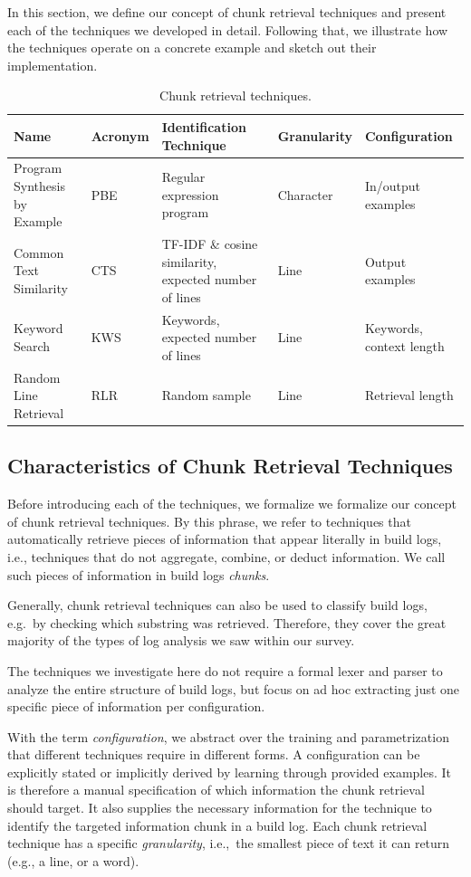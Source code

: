 In this section, we define our concept of chunk
retrieval techniques and present each of the techniques
we developed in detail.
Following that, we illustrate how the techniques
operate on a concrete
example and sketch out their implementation.

\begin{table}[htb]
\centering
\caption{Chunk retrieval techniques.}
\begin{tabularx}{\textwidth}{@{}llXll@{}}
\toprule
Name			     & Acronym & Identification Technique
& Granularity & Configuration \\
\midrule
Program Synthesis by Example & PBE     & Regular expression program
& Character   & In/output examples	\\
Common Text Similarity	     & CTS     & TF-IDF \& cosine similarity,
expected number of lines & Line        & Output examples	   \\
Keyword Search		     & KWS     & Keywords, expected number of
lines			 & Line        & Keywords, context length  \\
Random Line Retrieval	     & RLR     & Random sample
& Line	      & Retrieval length	  \\
\bottomrule
\end{tabularx}
\label{tab:techniques}
\end{table}

\subsection{Characteristics of Chunk Retrieval Techniques}
\label{sec:crt-characteristics}
Before introducing each of the techniques, we formalize
we formalize our concept of chunk retrieval techniques.
By this phrase, we refer to techniques that automatically
retrieve pieces of information that appear literally in build
logs, i.e., techniques that do not aggregate, combine, or deduct
information.
We call such pieces of information in build logs
\emph{chunks}.

Generally, chunk retrieval techniques
can also be used to classify build logs, e.g.\ by checking
which substring was retrieved.
Therefore, they
cover the great majority of the types of log analysis we saw within
our survey.

The techniques we investigate here do not require a formal lexer and
parser to analyze the entire structure of build logs, but focus on
ad hoc extracting just one specific piece of information per
configuration.

With the term \textit{configuration}, we abstract over the training
and parametrization that different techniques require in different
forms.
A configuration can be explicitly stated or implicitly derived
by learning through provided examples.
It is therefore a manual
specification of which information the chunk retrieval should target.
It also supplies the necessary information for the technique to
identify the targeted information chunk in a build log.
Each chunk
retrieval technique has a specific \textit{granularity}, i.e.,\ the
smallest piece of text it can return (e.g., a line, or a word).

